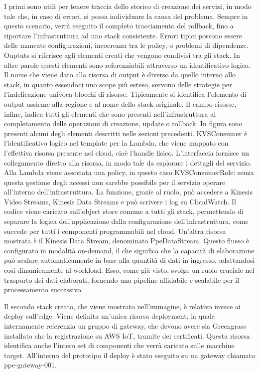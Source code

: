 I primi sono utili per tenere traccia dello storico di creazione dei servizi, in modo tale che, in caso di errori, si possa individuare la causa del problema. Sempre in questo scenario, verrà eseguito il completo tracciamento del rollback, fino a riportare l'infrastruttura ad uno stack consistente. Errori tipici possono essere delle mancate configurazioni, incoerenza tra le policy, o problemi di dipendenze. Ouptuts si riferisce agli elementi creati che vengono condivisi tra gli stack. In altre parole questi elementi sono referenziabili attraverso un identificativo logico. Il nome che viene dato alla risorsa di output è diverso da quello interno allo stack, in quanto essendoci uno scope più esteso, servono delle strategie per l'indeficazione univoca blocchi di risorse. Tipicamente si identifica l'elemento di output assieme alla regione e al nome dello stack originale. Il campo risorse, infine, indica tutti gli elementi che sono presenti nell'infrastruttura al completamento delle operazioni di creazione, update o rollback. In figura sono presenti alcuni degli elementi descritti nelle sezioni precedenti. KVSConsumer è l'identificativo logico nel template per la Lambda, che viene mappato con l'effettiva risorsa presente nel cloud, cioè l'handle fisico. L'interfaccia fornisce un collegamento diretto alla risorsa, in modo tale da esplorare i dettagli del servizio. Alla Lambda viene associata una policy, in questo caso KVSConsumerRole: senza questa gestione degli accessi non sarebbe possibile per il servizio operare all'interno dell'infrastruttura. La funzione, grazie al ruolo, può accedere a Kinesis Video Streams, Kinesis Data Streams e può scrivere i log su CloudWatch. Il codice viene caricato sull'object store comune a tutti gli stack, permettendo di separare la logica dell'applicazione dalla configurazione dell'infrastruttura, come succede per tutti i componenti programmabili nel cloud. Un'altra risorsa mostrata è il Kinesis Data Stream, denominato PpeDataStream. Questo flusso è configurato in modalità on-demand, il che significa che la capacità di elaborazione può scalare automaticamente in base alla quantità di dati in ingresso, adattandosi così dinamicamente al workload. Esso, come già visto, svolge un ruolo cruciale nel trasporto dei dati elaborati, fornendo una pipeline affidabile e scalabile per il processamento successivo. 
 
Il secondo stack creato, che viene mostrato nell'immagine, è relativo invece ai deploy sull'edge. Viene definita un'unica risorsa deployment, la quale internamente referenzia un gruppo di gateway, che devono avere sia Greengrass installato che la registrazione su AWS IoT, tramite dei certificati. Questa risorsa identifica anche l'intero set di componenti che verrà caricato sulle macchine target. All'interno del prototipo il deploy è stato eseguito su un gateway chiamato ppe-gateway-001. 

